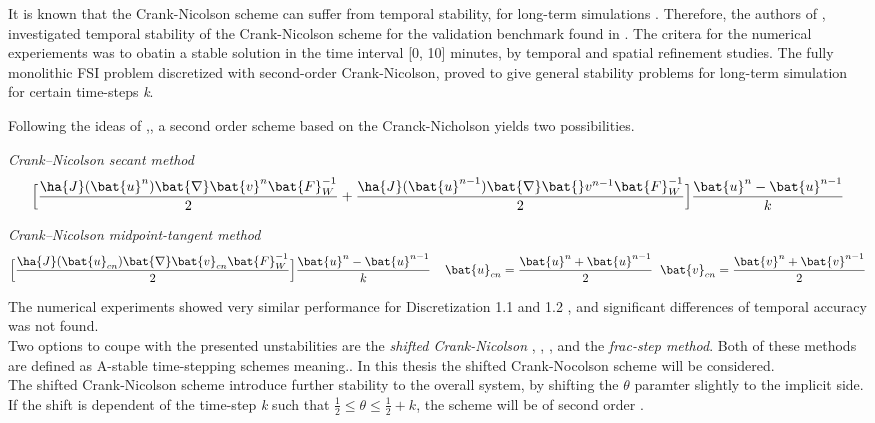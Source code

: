 It is known that the Crank-Nicolson scheme can suffer from temporal stability, for long-term simulations \cite{Wick2013a}. Therefore,
the authors of \cite{Richter2015}, investigated temporal stability of the Crank-Nicolson scheme for the validation benchmark found in \cite{Hron2006}.  
The critera for the numerical experiements was to obatin a stable solution in the time interval [0, 10] minutes, by temporal and spatial refinement studies. The fully monolithic FSI problem discretized with second-order Crank-Nicolson, proved to give general stability problems for long-term simulation for certain time-steps \textit{k}. 

Following the ideas of \cite{Richter2015},, a second order scheme based on the Cranck-Nicholson yields two possibilities.
\begin{discr}
\textit{Crank–Nicolson secant method }
\begin{align*}
\Big[\frac{\ha{J}(\bat{u}^{n}) \bat{\nabla} \bat{v}^{n} \bat{F}_W^{-1}}{2} 
+ \frac{\ha{J}(\bat{u}^{n-1}) \bat{\nabla} \bat{}v^{n-1} \bat{F}_W^{-1}}{2} \Big] 
\frac{\bat{u}^{n} - \bat{u}^{n-1}}{k}
\end{align*} 
\end{discr}

\begin{discr}
\textit{Crank–Nicolson midpoint-tangent method}
\begin{align*}
\Big[\frac{\ha{J}(\bat{u}_{cn}) \bat{\nabla} \bat{v}_{cn} \bat{F}_W^{-1}}{2} \Big] 
\frac{\bat{u}^{n} - \bat{u}^{n-1}}{k} \hspace{4mm}
\bat{u}_{cn} = \frac{\bat{u}^{n} + \bat{u}^{n-1}}{2} \hspace{2mm}
\bat{v}_{cn} = \frac{\bat{v}^{n} + \bat{v}^{n-1}}{2}
\end{align*} 
\end{discr}

The numerical experiments showed very similar performance for Discretization 1.1 and 1.2 , and significant differences of temporal accuracy was not found. \\
Two options to coupe with the presented unstabilities are the \textit{shifted Crank-Nicolson} \cite{Richter2015}, \cite{Wicka}, \cite{Wick2013a},   and the \textit{frac-step method}. Both of these methods are defined as A-stable time-stepping schemes meaning..  In this thesis the shifted Crank-Nocolson scheme will be considered. \\
The shifted Crank-Nicolson scheme introduce further stability to the overall system, by shifting the $\theta$ paramter slightly to the implicit side. If the shift is dependent of the time-step \textit{k} such that $\frac{1}{2} \leq \theta \leq \frac{1}{2} + k$, the scheme will be of second order \cite{Richter2015}.

